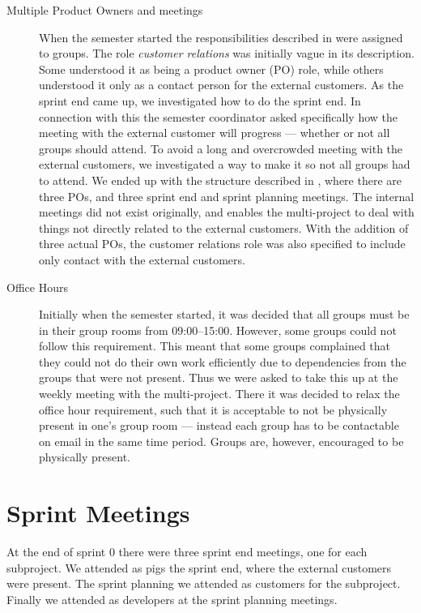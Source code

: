 \begin{description}
  \item[Multiple Product Owners and meetings] When the semester started the responsibilities described in  were assigned to groups. The role \emph{customer relations} was initially vague in its description. Some understood it as being a product owner (PO) role, while others understood it only as a contact person for the external customers. As the sprint end came up, we investigated how to do the sprint end. In connection with this the semester coordinator asked specifically how the meeting with the external customer will progress --- whether or not all groups should attend. To avoid a long and overcrowded meeting with the external customers, we investigated a way to make it so not all groups had to attend. We ended up with the structure described in , where there are three POs, and three sprint end and sprint planning meetings. The internal meetings did not exist originally, and enables the multi-project to deal with things not directly related to the external customers. With the addition of three actual POs, the customer relations role was also specified to include only contact with the external customers.
  \item[Office Hours] Initially when the semester started, it was decided that all groups must be in their group rooms from 09:00--15:00. However, some groups could not follow this requirement. This meant that some groups complained that they could not do their own work efficiently due to dependencies from the groups that were not present. Thus we were asked to take this up at the weekly meeting with the multi-project. There it was decided to relax the office hour requirement, such that it is acceptable to not be physically present in one's group room --- instead each group has to be contactable on email in the same time period. Groups are, however, encouraged to be physically present.
\end{description}

\section{Sprint Meetings}
At the end of sprint 0 there were three sprint end meetings, one for each subproject. We attended as pigs the \gui sprint end, where the external customers were present. The \db sprint planning we attended as customers for the \db subproject. Finally we attended as developers at the \bd sprint planning meetings.

